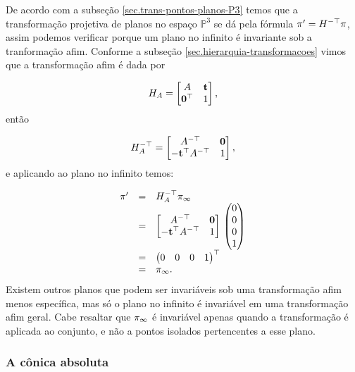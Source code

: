 De acordo com a subseção \ref{sec.trans-pontos-planos-P3} temos que a transformação projetiva de planos no espaço  $\mathbb{P}^3$ se dá pela fórmula $\pi'=H^{-\top}\pi$, assim podemos verificar porque um plano no infinito é invariante sob a tranformação afim. Conforme a subseção \ref{sec.hierarquia-transformacoes} vimos que a transformação afim é dada por 

\begin{equation*}
H_A=
\begin{bmatrix}
A&{\bf t}\\
{\bf 0}^\top&1
\end{bmatrix},
\end{equation*}
então

\begin{equation*}
H_A^{-\top}=
\begin{bmatrix}
A^{-\top}&{\bf 0}\\
-{\bf t}^\top A^{-\top}&1
\end{bmatrix},
\end{equation*}
e aplicando ao plano no infinito temos:

\begin{equation*}
\begin{array}{rcl}
\pi'&=&H_A^{-\top}\pi_\infty\\
&=&
\begin{bmatrix}
A^{-\top}&{\bf 0}\\
-{\bf t}^\top A^{-\top}&1
\end{bmatrix}\,
\begin{pmatrix}
0\\
0\\
0\\
1
\end{pmatrix}\\
&=&
\begin{pmatrix}
0&0&0&1
\end{pmatrix}^\top\\
&=&
\pi_\infty.
\end{array}
\end{equation*}
Existem outros planos que podem ser invariáveis sob uma transformação afim menos específica, mas só o plano no infinito é invariável em uma transformação afim geral. Cabe resaltar que $\pi_\infty$ é invariável apenas quando a transformação é aplicada ao conjunto, e não a pontos isolados pertencentes a esse plano.


\subsubsection{A cônica absoluta}\label{sec.con-absoluta}


